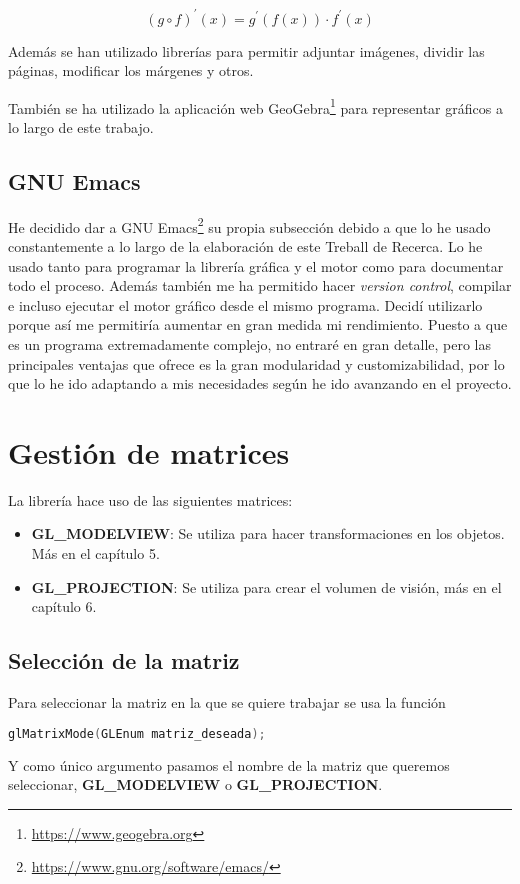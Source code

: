 \begin{equation*}
  (g \circ f)^\prime (x) = g^\prime (f(x))\cdot f^\prime(x)
\end{equation*}

Además se han utilizado librerías para permitir adjuntar imágenes, dividir las páginas, modificar los márgenes y otros.

También se ha utilizado la aplicación web GeoGebra\footnote{\url{https://www.geogebra.org}} para representar gráficos a lo largo de este trabajo.

\subsection{GNU Emacs}
He decidido dar a GNU Emacs\footnote{\url{https://www.gnu.org/software/emacs/}} su propia subsección debido a que lo he usado constantemente a lo largo de la elaboración de este Treball de Recerca. Lo he usado tanto para programar la librería gráfica y el motor como para documentar todo el proceso. Además también me ha permitido hacer \textit{version control}, compilar e incluso ejecutar el motor gráfico desde el mismo programa. Decidí utilizarlo porque así me permitiría aumentar en gran medida mi rendimiento. Puesto a que es un programa extremadamente complejo, no entraré en gran detalle, pero las principales ventajas que ofrece es la gran modularidad y customizabilidad, por lo que lo he ido adaptando a mis necesidades según he ido avanzando en el proyecto.
\newpage
\section{Gestión de matrices}
La librería hace uso de las siguientes matrices:
\begin{itemize}
\item{\textbf{GL\_MODELVIEW}: Se utiliza para hacer transformaciones en los objetos. Más en el capítulo 5.}
\item{\textbf{GL\_PROJECTION}: Se utiliza para crear el volumen de visión, más en el capítulo 6.}
\end{itemize}
\subsection{Selección de la matriz}
Para seleccionar la matriz en la que se quiere trabajar se usa la función
\begin{lstlisting}[language=C]
  glMatrixMode(GLEnum matriz_deseada);
\end{lstlisting}
Y como único argumento pasamos el nombre de la matriz que queremos seleccionar, \textbf{GL\_MODELVIEW} o \textbf{GL\_PROJECTION}.
